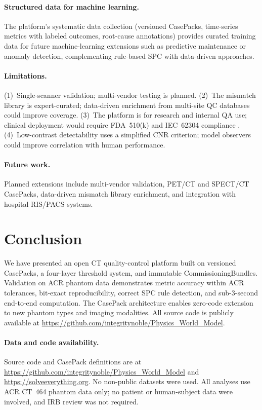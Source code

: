 \documentclass[11pt]{article}
\begin{document}
\paragraph{Structured data for machine learning.}
The platform's systematic data collection (versioned CasePacks,
time-series metrics with labeled outcomes, root-cause annotations)
provides curated training data for future machine-learning
extensions such as predictive maintenance or anomaly detection,
complementing rule-based SPC with data-driven approaches.

\paragraph{Limitations.}
(1)~Single-scanner validation; multi-vendor testing is planned.
(2)~The mismatch library is expert-curated; data-driven
enrichment from multi-site QC databases could improve coverage.
(3)~The platform is for research and internal QA use;
clinical deployment would require FDA~510(k) and
IEC~62304 compliance \cite{iec62304,samd_fda}.
(4)~Low-contrast detectability uses a simplified CNR
criterion; model observers \cite{solomon2014lcd} could improve
correlation with human performance.

\paragraph{Future work.}
Planned extensions include multi-vendor validation, PET/CT and
SPECT/CT CasePacks, data-driven mismatch library enrichment, and
integration with hospital RIS/PACS systems.


\section{Conclusion}
\label{sec:conclusion}

We have presented an open CT quality-control platform built on
versioned CasePacks, a four-layer threshold system, and immutable
CommissioningBundles.
Validation on ACR phantom data demonstrates metric accuracy within
ACR tolerances, bit-exact reproducibility, correct SPC rule
detection, and sub-3-second end-to-end computation.
The CasePack architecture enables zero-code extension to new phantom
types and imaging modalities.
All source code is publicly available at
\url{https://github.com/integritynoble/Physics_World_Model}.

\paragraph{Data and code availability.}
Source code and CasePack definitions are at
\url{https://github.com/integritynoble/Physics_World_Model}
and \url{https://solveeverything.org}.
No non-public datasets were used.
All analyses use ACR CT~464 phantom data only; no patient or
human-subject data were involved, and IRB review was not required.
\end{document}
